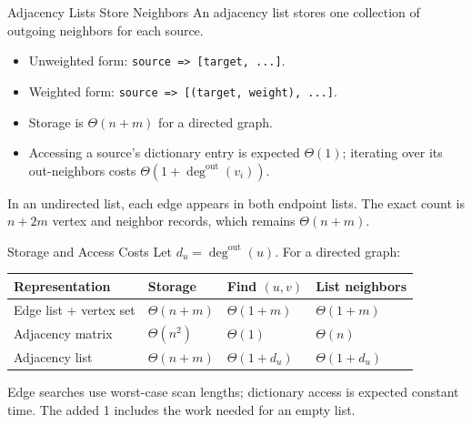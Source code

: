 \documentclass[aspectratio=169,11pt]{beamer}
\begin{document}
\begin{frame}{Adjacency Lists Store Neighbors}
  An adjacency list stores one collection of outgoing neighbors for each source.

  \vspace{0.7em}
  \begin{itemize}\setlength{\itemsep}{0.7em}
    \item Unweighted form: \texttt{source => [target, ...]}.
    \item Weighted form: \texttt{source => [(target, weight), ...]}.
    \item Storage is $\Theta(n+m)$ for a directed graph.
    \item Accessing a source's dictionary entry is expected $\Theta(1)$;
      iterating over its out-neighbors costs
      $\Theta(1+\deg^{\mathrm{out}}(v_i))$.
  \end{itemize}

  In an undirected list, each edge appears in both endpoint lists. The exact
  count is $n+2m$ vertex and neighbor records, which remains $\Theta(n+m)$.
\end{frame}

\begin{frame}{Storage and Access Costs}
  Let $d_u=\deg^{\mathrm{out}}(u)$. For a directed graph:

  \vspace{0.6em}
  \renewcommand{\arraystretch}{1.38}
  \begin{tabularx}{\textwidth}{>{\vnmedium}Xlll}
    \toprule
    Representation & Storage & Find $(u,v)$ & List neighbors \\
    \midrule
    Edge list + vertex set & $\Theta(n+m)$ & $\Theta(1+m)$ & $\Theta(1+m)$ \\
    Adjacency matrix & $\Theta(n^2)$ & $\Theta(1)$ & $\Theta(n)$ \\
    Adjacency list & $\Theta(n+m)$ & $\Theta(1+d_u)$ & $\Theta(1+d_u)$ \\
    \bottomrule
  \end{tabularx}

  \vspace{0.8em}
  Edge searches use worst-case scan lengths; dictionary access is expected
  constant time. The added 1 includes the work needed for an empty list.

\end{frame}
\end{document}
